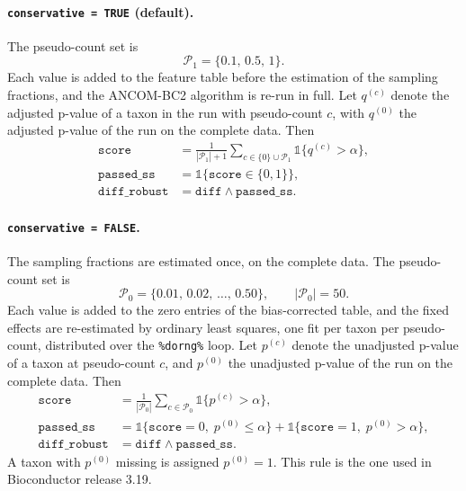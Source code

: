 \documentclass[11pt]{article}
\newcommand{\code}[1]{\texttt{#1}}
\begin{document}
\paragraph{\code{conservative = TRUE} (default).} The pseudo-count set is
\begin{equation}
\mathcal{P}_1 = \{0.1,\, 0.5,\, 1\}.
\end{equation}
Each value is added to the feature table before the estimation of the sampling
fractions, and the ANCOM-BC2 algorithm is re-run in full. Let $q^{(c)}$ denote
the adjusted p-value of a taxon in the run with pseudo-count $c$, with $q^{(0)}$
the adjusted p-value of the run on the complete data. Then
\begin{align}
\texttt{score} &= \frac{1}{|\mathcal{P}_1| + 1}
  \sum_{c \in \{0\} \cup \mathcal{P}_1}
  \mathbb{1}\{q^{(c)} > \alpha\}, \\
\texttt{passed\_ss} &= \mathbb{1}\{\texttt{score} \in \{0, 1\}\}, \\
\texttt{diff\_robust} &= \texttt{diff} \wedge \texttt{passed\_ss}.
\end{align}

\paragraph{\code{conservative = FALSE}.} The sampling fractions are estimated
once, on the complete data. The pseudo-count set is
\begin{equation}
\mathcal{P}_0 = \{0.01,\, 0.02,\, \ldots,\, 0.50\}, \qquad
|\mathcal{P}_0| = 50 .
\end{equation}
Each value is added to the zero entries of the bias-corrected table, and the
fixed effects are re-estimated by ordinary least squares, one fit per taxon per
pseudo-count, distributed over the \code{\%dorng\%} loop. Let $p^{(c)}$ denote
the unadjusted p-value of a taxon at pseudo-count $c$, and $p^{(0)}$ the
unadjusted p-value of the run on the complete data. Then
\begin{align}
\texttt{score} &= \frac{1}{|\mathcal{P}_0|}
  \sum_{c \in \mathcal{P}_0} \mathbb{1}\{p^{(c)} > \alpha\}, \\
\texttt{passed\_ss} &= \mathbb{1}\{\texttt{score} = 0,\; p^{(0)} \le \alpha\}
  + \mathbb{1}\{\texttt{score} = 1,\; p^{(0)} > \alpha\}, \\
\texttt{diff\_robust} &= \texttt{diff} \wedge \texttt{passed\_ss}.
\end{align}
A taxon with $p^{(0)}$ missing is assigned $p^{(0)} = 1$. This rule is the one
used in Bioconductor release 3.19.
\end{document}
